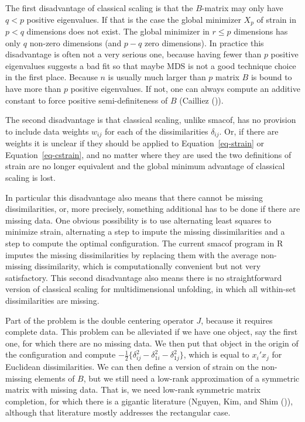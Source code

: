 \documentclass[
  12pt,
  letterpaper,
  DIV=11,
  numbers=noendperiod]{scrartcl}
\begin{document}
The first disadvantage of classical scaling is that the \(B\)-matrix may
only have \(q<p\) positive eigenvalues. If that is the case the global
minimizer \(X_p\) of strain in \(p<q\) dimensions does not exist. The
global minimizer in \(r\leq p\) dimensions has only \(q\) non-zero
dimensions (and \(p-q\) zero dimensions). In practice this disadvantage
is often not a very serious one, because having fewer than \(p\)
positive eigenvalues suggests a bad fit so that maybe MDS is not a good
technique choice in the first place. Because \(n\) is usually much
larger than \(p\) matrix \(B\) is bound to have more than \(p\) positive
eigenvalues. If not, one can always compute an additive constant to
force positive semi-definiteness of \(B\) (Cailliez
()).

The second disadvantage is that classical scaling, unlike smacof, has no
provision to include data weights \(w_{ij}\) for each of the
dissimilarities \(\delta_{ij}\). Or, if there are weights it is unclear
if they should be applied to Equation~\ref{eq-strain} or
Equation~\ref{eq-cstrain}, and no matter where they are used the two
definitions of strain are no longer equivalent and the global minimum
advantage of classical scaling is lost.

In particular this disadvantage also means that there cannot be missing
dissimilarities, or, more precisely, something additional has to be done
if there are missing data. One obvious possibility is to use alternating
least squares to minimize strain, alternating a step to impute the
missing dissimilarities and a step to compute the optimal configuration.
The current smacof program in R imputes the missing dissimilarities by
replacing them with the average non-missing dissimilarity, which is
computationally convenient but not very satisfactory. This second
disadvantage also means there is no straightforward version of classical
scaling for multidimensional unfolding, in which all within-set
dissimilarities are missing.

Part of the problem is the double centering operator \(J\), because it
requires complete data. This problem can be alleviated if we have one
object, say the first one, for which there are no missing data. We then
put that object in the origin of the configuration and compute
\(-\frac12\{\delta_{ij}^2-\delta_{1i}^2-\delta_{1j}^2\}\), which is
equal to \(x_i'x_j\) for Euclidean dissimilarities. We can then define a
version of strain on the non-missing elements of \(B\), but we still
need a low-rank approximation of a symmetric matrix with missing data.
That is, we need low-rank symmetric matrix completion, for which there
is a gigantic literature (Nguyen, Kim, and Shim
()), although that literature
mostly addresses the rectangular case.
\end{document}
